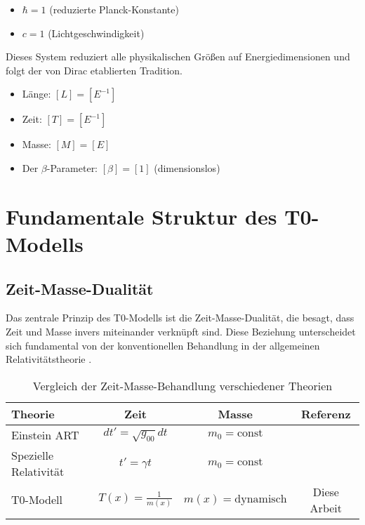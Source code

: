 \documentclass[12pt,a4paper]{article}
\begin{document}
	\begin{itemize}
		\item $\hbar = 1$ (reduzierte Planck-Konstante)
		\item $c = 1$ (Lichtgeschwindigkeit)
	\end{itemize}
	
	Dieses System reduziert alle physikalischen Größen auf Energiedimensionen und folgt der von Dirac \citep{dirac1958} etablierten Tradition.
	
	\begin{tcolorbox}[colback=blue!5!white,colframe=blue!75!black,title=Dimensionen in natürlichen Einheiten]
		\begin{itemize}
			\item Länge: $[L] = [E^{-1}]$
			\item Zeit: $[T] = [E^{-1}]$ 
			\item Masse: $[M] = [E]$
			\item Der $\beta$-Parameter: $[\beta] = [1]$ (dimensionslos)
		\end{itemize}
	\end{tcolorbox}
	
	\section{Fundamentale Struktur des T0-Modells}
	\label{sec:fundamental_structure}
	
	\subsection{Zeit-Masse-Dualität}
	\label{subsec:time_mass_duality}
	
	Das zentrale Prinzip des T0-Modells ist die Zeit-Masse-Dualität, die besagt, dass Zeit und Masse invers miteinander verknüpft sind. Diese Beziehung unterscheidet sich fundamental von der konventionellen Behandlung in der allgemeinen Relativitätstheorie \citep{einstein1915,misner1973}.
	
	\begin{table}[htbp]
		\centering
		\begin{tabular}{|l|c|c|c|}
			\hline
			\textbf{Theorie} & \textbf{Zeit} & \textbf{Masse} & \textbf{Referenz} \\
			\hline
			Einstein ART & $dt' = \sqrt{g_{00}} dt$ & $m_0 = \text{const}$ & \citep{einstein1915,misner1973} \\
			Spezielle Relativität & $t' = \gamma t$ & $m_0 = \text{const}$ & \citep{einstein1905} \\
			T0-Modell & $T(x) = \frac{1}{m(x)}$ & $m(x) = \text{dynamisch}$ & Diese Arbeit \\
			\hline
		\end{tabular}
		\caption{Vergleich der Zeit-Masse-Behandlung verschiedener Theorien}
		\label{tab:theory_comparison}
	\end{table}
	
\end{document}
